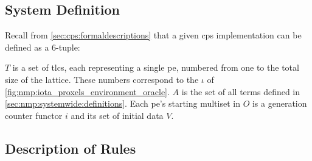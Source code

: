 \subsection{System Definition}
Recall from \cref{sec:cps:formaldescriptions} that a given \gls{cps} implementation can be defined as a 6-tuple:


\(T\) is a set of \glspl{tlc}, each representing a single \gls{pe}, numbered from one to the total size of the lattice.  These numbers correspond to the \(\iota\) of \cref{fig:nmp:iota_proxels_environment_oracle}.  \(A\) is the set of all terms defined in \cref{sec:nmp:systemwide:definitions}.  Each \gls{pe}'s starting multiset in \(O\) is a generation counter functor \(i\) and its set of initial data \(V\).

\subsection{\label{sec:nmp:systemwide:rulesdesc}Description of Rules}

